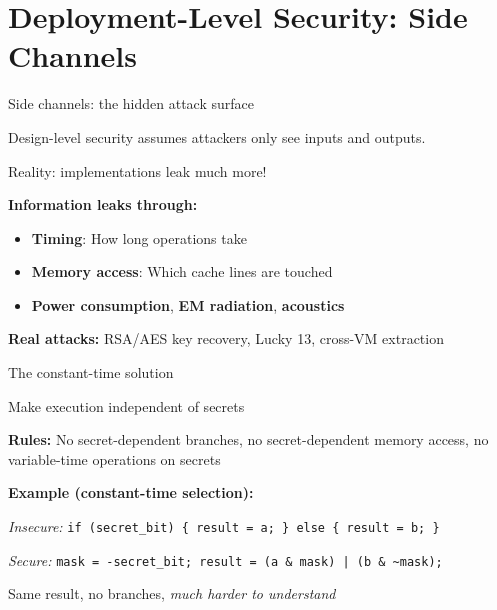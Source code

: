 \ifdefined\PRESENTATION\else\PassOptionsToClass{handout}{beamer}\fi\documentclass[aspectratio=169, lualatex]{beamer}
\begin{document}
\section{Deployment-Level Security: Side Channels}

\begin{frame}{Side channels: the hidden attack surface}
	\begin{center}
		\Large
		Design-level security assumes attackers only see inputs and outputs.

		\normalsize
		Reality: implementations leak much more!
	\end{center}
	\vspace{0.5em}
	\textbf{Information leaks through:}
	\begin{itemize}
		\item \textbf{Timing}: How long operations take
		\item \textbf{Memory access}: Which cache lines are touched
		\item \textbf{Power consumption}, \textbf{EM radiation}, \textbf{acoustics}
	\end{itemize}
	\vspace{0.5em}
	\textbf{Real attacks:} RSA/AES key recovery, Lucky 13, cross-VM extraction
\end{frame}

\begin{frame}{The constant-time solution}
	\begin{center}
		\Large
		Make execution independent of secrets
	\end{center}
	\vspace{0.5em}
	\textbf{Rules:} No secret-dependent branches, no secret-dependent memory access, no variable-time operations on secrets
	\vspace{0.5em}

	\textbf{Example (constant-time selection):}
	\begin{flushleft}
		\textit{Insecure:} \texttt{if (secret\_bit) \{ result = a; \} else \{ result = b; \}}
	\end{flushleft}
	\begin{flushleft}
		\textit{Secure:} \texttt{mask = -secret\_bit; result = (a \& mask) | (b \& \textasciitilde mask);}
	\end{flushleft}
	\vspace{0.5em}
	\begin{center}
		Same result, no branches, \textit{much harder to understand}
	\end{center}
\end{frame}
\end{document}
